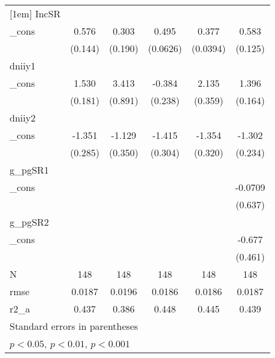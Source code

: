 \begin{table}[htbp]
\begin{tabular}{l*{5}{c}}
[1em]
IncSR     &                  &                  &                  &                  &                  \\
\_cons    &    0.576\sym{***}&    0.303         &    0.495\sym{***}&    0.377\sym{***}&    0.583\sym{***}\\
          &  (0.144)         &  (0.190)         & (0.0626)         & (0.0394)         &  (0.125)         \\
[1em]
dniiy1    &                  &                  &                  &                  &                  \\
\_cons    &    1.530\sym{***}&    3.413\sym{***}&   -0.384         &    2.135\sym{***}&    1.396\sym{***}\\
          &  (0.181)         &  (0.891)         &  (0.238)         &  (0.359)         &  (0.164)         \\
[1em]
dniiy2    &                  &                  &                  &                  &                  \\
\_cons    &   -1.351\sym{***}&   -1.129\sym{**} &   -1.415\sym{***}&   -1.354\sym{***}&   -1.302\sym{***}\\
          &  (0.285)         &  (0.350)         &  (0.304)         &  (0.320)         &  (0.234)         \\
[1em]
g\_pgSR1   &                  &                  &                  &                  &                  \\
\_cons    &                  &                  &                  &                  &  -0.0709         \\
          &                  &                  &                  &                  &  (0.637)         \\
[1em]
g\_pgSR2   &                  &                  &                  &                  &                  \\
\_cons    &                  &                  &                  &                  &   -0.677         \\
          &                  &                  &                  &                  &  (0.461)         \\
\hline
N         &      148         &      148         &      148         &      148         &      148         \\
rmse      &   0.0187         &   0.0196         &   0.0186         &   0.0186         &   0.0187         \\
r2\_a      &    0.437         &    0.386         &    0.448         &    0.445         &    0.439         \\
\hline\hline
\multicolumn{6}{l}{\footnotesize Standard errors in parentheses}\\
\multicolumn{6}{l}{\footnotesize \sym{*} \(p<0.05\), \sym{**} \(p<0.01\), \sym{***} \(p<0.001\)}\\
\end{tabular}
\end{table}
